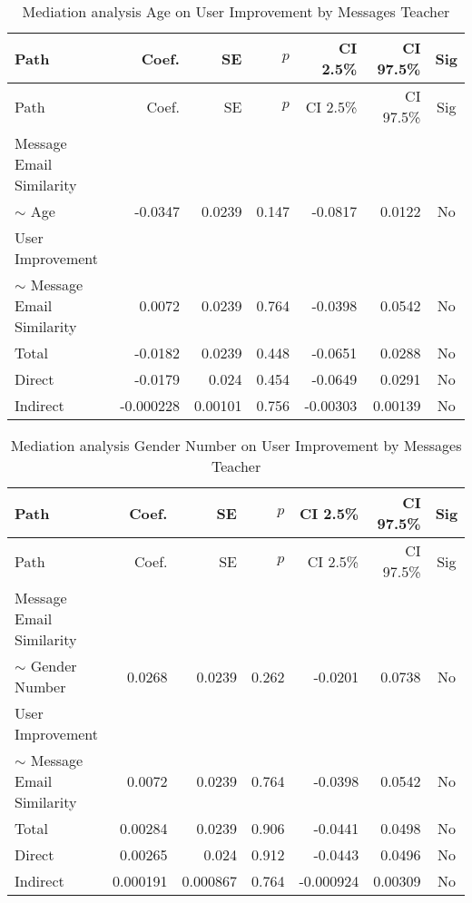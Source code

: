 \begin{longtable}{lrrrrrc}
            \caption{Mediation analysis Age on User Improvement by  Messages Teacher}\label{tab:mediation Age on User Improvement by  Messages Teacher}\\
            \toprule
            Path & Coef. & SE & $p$ & CI 2.5\% & CI 97.5\% & Sig \\
            \midrule
            \endfirsthead
            \toprule
            Path & Coef. & SE & $p$ & CI 2.5\% & CI 97.5\% & Sig \\
            \midrule
            \endhead
            \bottomrule
            \endfoot
            Message Email Similarity\\ $\sim$ Age & -0.0347 & 0.0239 & 0.147 & -0.0817 & 0.0122 & No \\
User Improvement\\ $\sim$ Message Email Similarity & 0.0072 & 0.0239 & 0.764 & -0.0398 & 0.0542 & No \\
Total & -0.0182 & 0.0239 & 0.448 & -0.0651 & 0.0288 & No \\
Direct & -0.0179 & 0.024 & 0.454 & -0.0649 & 0.0291 & No \\
Indirect & -0.000228 & 0.00101 & 0.756 & -0.00303 & 0.00139 & No \\
\end{longtable}

\begin{longtable}{lrrrrrc}
            \caption{Mediation analysis Gender Number on User Improvement by  Messages Teacher}\label{tab:mediation Gender Number on User Improvement by  Messages Teacher}\\
            \toprule
            Path & Coef. & SE & $p$ & CI 2.5\% & CI 97.5\% & Sig \\
            \midrule
            \endfirsthead
            \toprule
            Path & Coef. & SE & $p$ & CI 2.5\% & CI 97.5\% & Sig \\
            \midrule
            \endhead
            \bottomrule
            \endfoot
            Message Email Similarity\\ $\sim$ Gender Number & 0.0268 & 0.0239 & 0.262 & -0.0201 & 0.0738 & No \\
User Improvement\\ $\sim$ Message Email Similarity & 0.0072 & 0.0239 & 0.764 & -0.0398 & 0.0542 & No \\
Total & 0.00284 & 0.0239 & 0.906 & -0.0441 & 0.0498 & No \\
Direct & 0.00265 & 0.024 & 0.912 & -0.0443 & 0.0496 & No \\
Indirect & 0.000191 & 0.000867 & 0.764 & -0.000924 & 0.00309 & No \\
\end{longtable}

